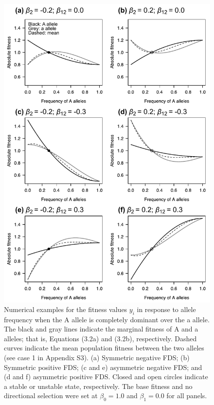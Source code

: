 \documentclass[12pt,]{article}
\begin{document}
\begin{figure}[]
  \includegraphics[width=0.75\linewidth]{AsymFDSdomi.pdf}
  \caption{Numerical examples for the fitness values $y_i$ in response to allele frequency when the A allele is completely dominant over the a allele. The black and gray lines indicate the marginal fitness of A and a alleles; that is, Equations (3.2a) and (3.2b), respectively. Dashed curves indicate the mean population fitness between the two alleles (see case 1 in Appendix S3). (a) Symmetric negative FDS; (b) Symmetric positive FDS; (c and e) asymmetric negative FDS; and (d and f) asymmetric positive FDS. Closed and open circles indicate a stable or unstable state, respectively. The base fitness and no directional selection were set at $\beta_0=1.0$ and $\beta_1=0.0$ for all panels.}
  \label{fig2:asym}
\end{figure}
\end{document}
